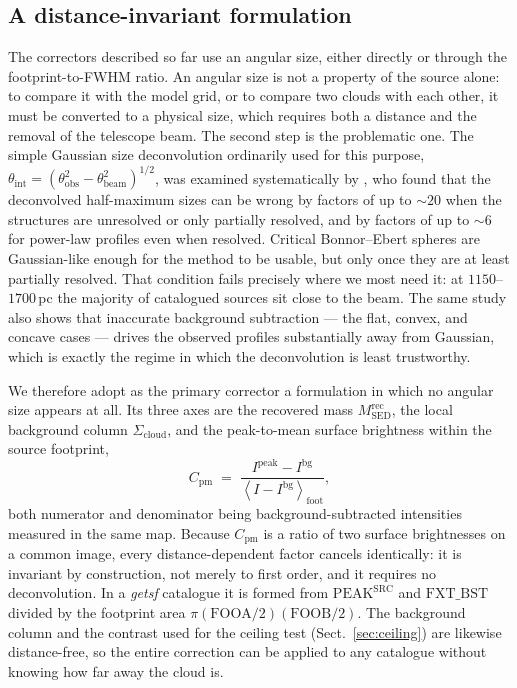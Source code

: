 \documentclass[11pt,a4paper]{article}
\newcommand{\Scloud}{\Sigma_{\mathrm{cloud}}}
\begin{document}
\subsection{A distance-invariant formulation}
\label{sec:invariant}

The correctors described so far use an angular size, either directly or through
the footprint-to-FWHM ratio. An angular size is not a property of the source
alone: to compare it with the model grid, or to compare two clouds with each
other, it must be converted to a physical size, which requires both a distance
and the removal of the telescope beam. The second step is the problematic one.
The simple Gaussian size deconvolution ordinarily used for this purpose,
$\theta_{\mathrm{int}}=(\theta_{\mathrm{obs}}^{2}-\theta_{\mathrm{beam}}^{2})
^{1/2}$, was examined systematically by \citet{Menshchikov2023}, who found that
the deconvolved half-maximum sizes can be wrong by factors of up to $\sim$$20$
when the structures are unresolved or only partially resolved, and by factors
of up to $\sim$$6$ for power-law profiles even when resolved. Critical
Bonnor--Ebert spheres are Gaussian-like enough for the method to be usable, but
only once they are at least partially resolved. That condition fails precisely
where we most need it: at $1150$--$1700$\,pc the majority of catalogued sources
sit close to the beam. The same study also shows that inaccurate background
subtraction --- the flat, convex, and concave cases --- drives the observed
profiles substantially away from Gaussian, which is exactly the regime in which
the deconvolution is least trustworthy.

We therefore adopt as the primary corrector a formulation in which no angular
size appears at all. Its three axes are the recovered mass
$M^{\mathrm{rec}}_{\mathrm{SED}}$, the local background column $\Scloud$, and
the peak-to-mean surface brightness within the source footprint,
%
\begin{equation}
  C_{\mathrm{pm}}\;=\;
  \frac{I^{\mathrm{peak}}-I^{\mathrm{bg}}}
       {\left\langle I-I^{\mathrm{bg}}\right\rangle_{\mathrm{foot}}},
  \label{eq:cpm}
\end{equation}
%
both numerator and denominator being background-subtracted intensities measured
in the same map. Because $C_{\mathrm{pm}}$ is a ratio of two surface
brightnesses on a common image, every distance-dependent factor cancels
identically: it is invariant by construction, not merely to first order, and it
requires no deconvolution. In a \emph{getsf} catalogue it is formed from
$\mathrm{PEAK^{SRC}}$ and $\mathrm{FXT\_BST}$ divided by the footprint area
$\pi(\mathrm{FOOA}/2)(\mathrm{FOOB}/2)$. The background column and the
contrast used for the ceiling test (Sect.~\ref{sec:ceiling}) are likewise
distance-free, so the entire correction can be applied to any catalogue without
knowing how far away the cloud is.
\end{document}

